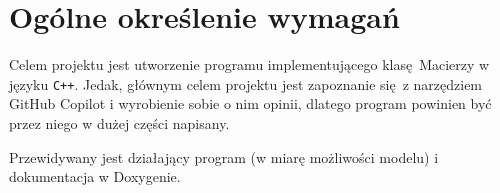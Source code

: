 	\newpage
\section{Ogólne określenie wymagań}		%

\hspace{0.60cm}

Celem projektu jest utworzenie programu implementującego klasę Macierzy w języku \texttt{C++}. Jedak, głównym celem projektu jest zapoznanie się z narzędziem GitHub Copilot i wyrobienie sobie o nim opinii, dlatego program powinien być przez niego w dużej części napisany. 

Przewidywany jest działający program (w miarę możliwości modelu) i dokumentacja w Doxygenie.
